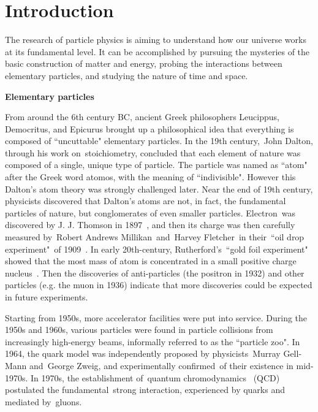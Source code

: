
\chapter{Introduction}

The research of particle physics is aiming to understand how our universe works at its fundamental level. It can be accomplished by pursuing the mysteries of the basic construction of matter and energy, probing the interactions between elementary particles, and studying the nature of time and space. 

\textbf{Elementary particles}

From around the 6th century BC, ancient Greek philosophers Leucippus, Democritus, and Epicurus brought up a philosophical idea that everything is composed of ``uncuttable" elementary particles. 
In the 19th century, John Dalton, through his work on stoichiometry, concluded that each element of nature was composed of a single, unique type of particle. 
The particle was named as ``atom" after the Greek word atomos, with the meaning of ``indivisible". 
However this Dalton's atom theory was strongly challenged later. Near the end of 19th century, physicists discovered that Dalton's atoms are not, in fact, the fundamental particles of nature, 
but conglomerates of even smaller particles. 
Electron was discovered by J. J. Thomson in 1897~\cite{Thomson1897}, and then its charge was then carefully measured by Robert Andrews Millikan and Harvey Fletcher in their ``oil drop experiment" of 1909~\cite{PhysRev.2.109}. 
In early 20th-century, Rutherford's ``gold foil experiment" showed that the most mass of atom is concentrated in a small positive charge nucleus~\cite{Rutherford1911}. 
Then the discoveries of anti-particles (the positron in 1932) and other particles (e.g. the muon in 1936) indicate that more discoveries could be expected in future experiments.

Starting from 1950s, more accelerator facilities were put into service. 
During the 1950s and 1960s, various particles were found in particle collisions from increasingly high-energy beams, informally referred to as the ``particle zoo".
In 1964, the quark model was independently proposed by physicists Murray Gell-Mann and George Zweig, and experimentally confirmed of their existence in mid-1970s. 
In 1970s, the establishment of quantum chromodynamics  (QCD) postulated the fundamental strong interaction, experienced by quarks and mediated by gluons.

